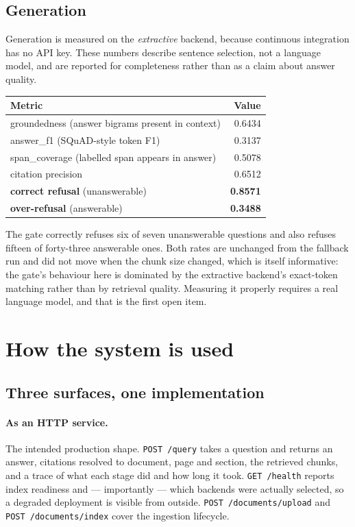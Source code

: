 \documentclass[11pt,a4paper]{article}
\newcommand{\code}[1]{\texttt{\small #1}}
\begin{document}
\subsection{Generation}

Generation is measured on the \emph{extractive} backend, because continuous
integration has no API key. These numbers describe sentence selection, not a
language model, and are reported for completeness rather than as a claim about
answer quality.

\begin{center}
\small
\begin{tabular}{@{}lr@{}}
\toprule
\textbf{Metric} & \textbf{Value} \\
\midrule
groundedness (answer bigrams present in context) & 0.6434 \\
answer\_f1 (SQuAD-style token F1)                 & 0.3137 \\
span\_coverage (labelled span appears in answer)  & 0.5078 \\
citation precision                                & 0.6512 \\
\textbf{correct refusal} (unanswerable)           & \textbf{0.8571} \\
\textbf{over-refusal} (answerable)                & \textbf{0.3488} \\
\bottomrule
\end{tabular}
\end{center}

The gate correctly refuses six of seven unanswerable questions and also refuses
fifteen of forty-three answerable ones. Both rates are unchanged from the
fallback run and did not move when the chunk size changed, which is itself
informative: the gate's behaviour here is dominated by the extractive backend's
exact-token matching rather than by retrieval quality. Measuring it properly
requires a real language model, and that is the first open item.

\section{How the system is used}

\subsection{Three surfaces, one implementation}

\paragraph{As an HTTP service.} The intended production shape. \code{POST /query}
takes a question and returns an answer, citations resolved to document, page and
section, the retrieved chunks, and a trace of what each stage did and how long it
took. \code{GET /health} reports index readiness and --- importantly --- which
backends were actually selected, so a degraded deployment is visible from
outside. \code{POST /documents/upload} and \code{POST /documents/index} cover the
ingestion lifecycle.
\end{document}
